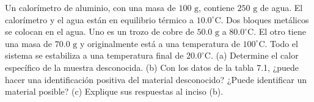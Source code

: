 \item Un calorímetro de aluminio, con una masa de $100 \text{ g}$, contiene $250 \text{ g}$ de agua. El calorímetro y el agua están en equilibrio térmico a $10.0 ^\circ\text{C}$. Dos bloques metálicos se colocan en el agua. Uno es un trozo de cobre de $50.0 \text{ g}$ a $80.0 ^\circ\text{C}$. El otro tiene una masa de $70.0 \text{ g}$ y originalmente está a una temperatura de $100 ^\circ\text{C}$. Todo el sistema se estabiliza a una temperatura final de $20.0 ^\circ\text{C}$. (a) Determine el calor específico de la muestra desconocida. (b) Con los datos de la tabla 7.1, ¿puede hacer una identificación positiva del material desconocido? ¿Puede identificar un material posible? (c) Explique sus respuestas al inciso (b).
